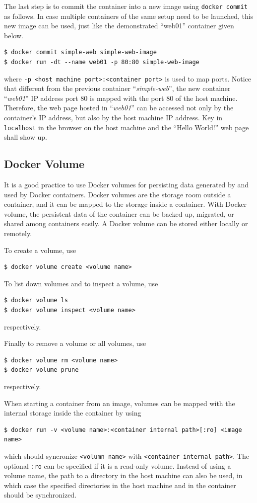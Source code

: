 The last step is to commit the container into a new image using \verb|docker commit| as follows. In case multiple containers of the same setup need to be launched, this new image can be used, just like the demonstrated ``web01'' container given below.
\begin{lstlisting}
$ docker commit simple-web simple-web-image
$ docker run -dt --name web01 -p 80:80 simple-web-image
\end{lstlisting}
where \verb|-p <host machine port>:<container port>| is used to map ports. Notice that different from the previous container ``\textit{simple-web}'', the new container ``\textit{web01}'' IP address port 80 is mapped with the port 80 of the host machine. Therefore, the web page hosted in ``\textit{web01}'' can be accessed not only by the container's IP address, but also by the host machine IP address. Key in \verb|localhost| in the browser on the host machine and the ``Hello World!'' web page shall show up.

\subsection{Docker Volume}

It is a good practice to use Docker volumes for persisting data generated by and used by Docker containers. Docker volumes are the storage room outside a container, and it can be mapped to the storage inside a container. With Docker volume, the persistent data of the container can be backed up, migrated, or shared among containers easily. A Docker volume can be stored either locally or remotely.

To create a volume, use
\begin{lstlisting}
$ docker volume create <volume name>
\end{lstlisting}

To list down volumes and to inspect a volume, use
\begin{lstlisting}
$ docker volume ls
$ docker volume inspect <volume name>
\end{lstlisting}
respectively.

Finally to remove a volume or all volumes, use
\begin{lstlisting}
$ docker volume rm <volume name>
$ docker volume prune
\end{lstlisting}
respectively.

When starting a container from an image, volumes can be mapped with the internal storage inside the container by using
\begin{lstlisting}
$ docker run -v <volume name>:<container internal path>[:ro] <image name>
\end{lstlisting}
which should syncronize \verb|<volumn name>| with \verb|<container internal path>|. The optional \verb|:ro| can be specified if it is a read-only volume. Instead of using a volume name, the path to a directory in the host machine can also be used, in which case the specified directories in the host machine and in the container should be synchronized.

